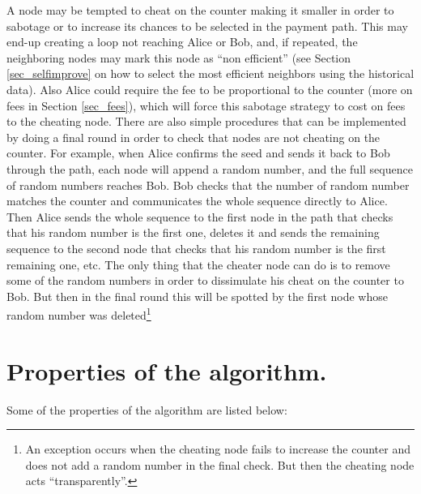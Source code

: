 \documentclass[12pt]{amsart}
\theoremstyle{remark}
\begin{document}
A node may be tempted to cheat on the counter making it smaller in order to sabotage or to increase 
its chances to be selected in the payment path. This may end-up creating 
a loop not reaching Alice or Bob, and, if repeated, the neighboring nodes may mark this node as ``non efficient'' (see Section \ref{sec_selfimprove} on 
how to select the most efficient neighbors using the historical data). Also Alice could require the fee to be proportional 
to the counter (more on fees in Section \ref{sec_fees}), which will force this sabotage strategy to cost on fees to the cheating node. 
There are also simple procedures that can be implemented by doing a final round 
in order to check that nodes are not cheating on the counter. For example, when Alice confirms 
the seed and sends it back to Bob through the path, each
node will append a random number, and the full sequence of random numbers reaches Bob. Bob checks that the number of random number 
matches the counter and communicates the whole sequence directly to Alice. 
Then Alice sends the whole sequence to the first node in the path that checks that his random number is the first one, deletes it and sends the remaining sequence 
to the second node that checks that his random number is the first remaining one, etc. 
The only thing that the cheater node can do is to remove some of the random numbers in order to dissimulate his cheat 
on the counter to Bob. 
But then in the final round this will be spotted by the first node whose random number was deleted\footnote{An exception occurs when the cheating node fails to 
increase the counter and does not add a random number in the final check. But then the cheating node acts ``transparently''.}



\section{Properties of the algorithm.}\label{sec_properties}

Some of the properties of the algorithm are listed below:
\end{document}
